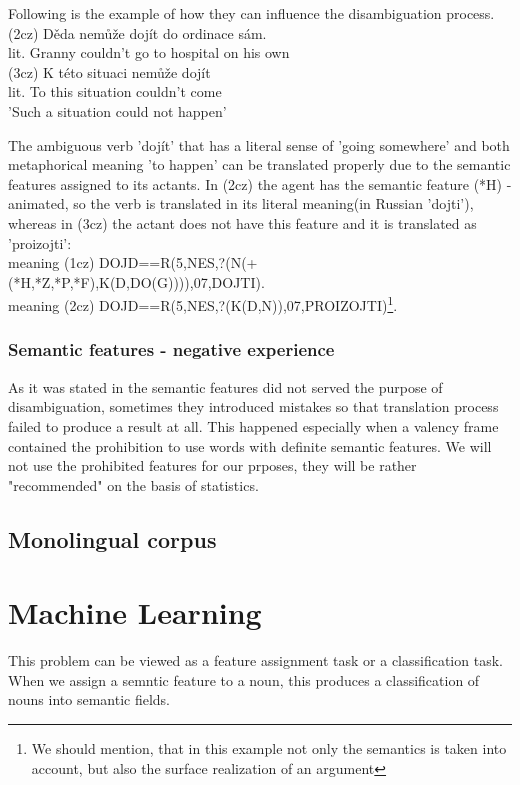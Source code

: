 \documentclass[letterpaper]{article}
\begin{document}
\begin{itemize}
Following is the example of how they can influence the disambiguation process.\\
(2cz) Děda nemůže dojít do ordinace sám.\\
lit. Granny couldn't go to hospital on his own\\
(3cz) K této situaci nemůže dojít\\
lit. To this situation couldn't come\\
'Such a situation could not happen'

The ambiguous verb 'dojít' that has a literal sense of 'going somewhere'
and both metaphorical meaning 'to happen' can be translated properly
due to the semantic features assigned to its actants. In (2cz) the
agent has the semantic feature (*H) - animated, so the verb is translated
in its literal meaning(in Russian 'dojti'), whereas in (3cz) the actant does not have this feature
and it is translated as 'proizojti':\\
meaning (1cz) DOJD==R(5,NES,?(N(+(*H,*Z,*P,*F),K(D,DO(G)))),07,DOJTI).\\
meaning (2cz) DOJD==R(5,NES,?(K(D,N)),07,PROIZOJTI)\footnote{We should mention, that in this example
not only the semantics is taken into account, but also the surface realization of an argument}.\\


\subsubsection{Semantic features - negative experience}
As it was stated in \cite{KubonPHD2001} the semantic features did not
served the purpose of disambiguation, sometimes they introduced mistakes
so that translation process failed to produce a result at all. This
happened especially when a valency frame contained the prohibition
to use words with definite semantic features.
We will not use the prohibited features for our prposes, they will be rather "recommended" on the basis of
statistics. 


\subsection{Monolingual corpus}


\section{Machine Learning}

This problem can be viewed as a feature assignment task or a 
classification task. %
When we assign a semntic feature to a noun, this produces a classification
of nouns into semantic fields.



\end{itemize}
\end{document}
